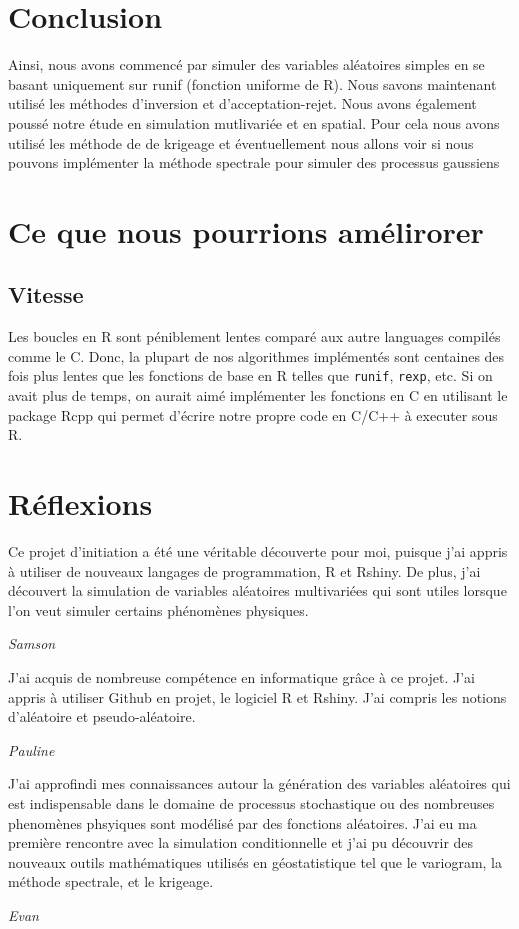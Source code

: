 \documentclass[10pt]{article} %
\begin{document}
\section{Conclusion}

Ainsi, nous avons commencé par simuler des variables aléatoires simples en se basant
uniquement sur runif (fonction uniforme de R). Nous savons maintenant utilisé les méthodes
 d'inversion et d'acceptation-rejet. Nous avons également poussé notre étude en simulation
 mutlivariée et en spatial. Pour cela nous avons utilisé les méthode de de krigeage et éventuellement
 nous allons voir si nous pouvons implémenter la méthode spectrale pour simuler des processus gaussiens

\section{Ce que nous pourrions amélirorer}
\subsection{Vitesse}

Les boucles en R sont péniblement lentes comparé aux autre languages compilés comme le C. Donc, la plupart de nos algorithmes implémentés sont
centaines des fois plus lentes que les fonctions de base en R telles que \texttt{runif}, \texttt{rexp}, etc. Si on avait plus de temps,
on aurait aimé implémenter les fonctions en C en utilisant le package Rcpp qui permet d'écrire notre propre code en C/C++ à executer sous R.
\section{Réflexions}

\renewcommand {\epigraphflush} {flushleft}
\epigraph{Ce projet d'initiation a été une véritable découverte pour moi, puisque j'ai appris à
 utiliser de nouveaux langages de programmation, R et Rshiny. De plus, j'ai découvert la
  simulation de variables aléatoires multivariées qui sont utiles
lorsque l'on veut simuler certains phénomènes physiques.} {\textit{Samson}}

\epigraph{J'ai acquis de nombreuse compétence en informatique grâce à ce projet. J'ai appris à utiliser Github en projet,
le logiciel R et Rshiny. J'ai compris les notions d'aléatoire et pseudo-aléatoire.}
 {\textit{Pauline}}

\epigraph{J'ai approfindi mes connaissances autour la génération des variables aléatoires qui est indispensable dans le domaine
de processus stochastique ou des nombreuses phenomènes phsyiques sont modélisé par des fonctions aléatoires. J'ai eu ma première rencontre
avec la simulation conditionnelle et j'ai pu découvrir des nouveaux outils mathématiques utilisés en géostatistique tel que le variogram, la méthode spectrale,
et le krigeage.}
 {\textit{Evan}}
\end{document}
